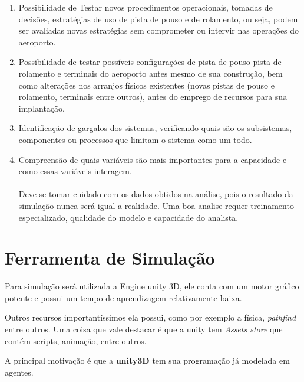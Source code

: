 \documentclass[12pt]{article}
\begin{document}
  
  \begin{enumerate}
  
  \item Possibilidade de Testar novos procedimentos operacionais, tomadas
   de decisões, estratégias de uso de pista de pouso e de rolamento, ou seja,
   podem ser avaliadas novas estratégias sem comprometer ou intervir nas 
   operações do aeroporto.
  
  \item Possibilidade de testar possíveis configurações de pista de pouso
    pista de rolamento e terminais do aeroporto antes mesmo de sua construção, 
    bem como alterações nos arranjos físicos existentes (novas pistas de pouso
    e rolamento, terminais entre outros), antes do emprego de recursos para
    sua implantação.
  
  \item Identificação de gargalos dos sistemas, verificando quais são os 
    subsistemas, componentes ou processos que limitam o sistema como um
    todo.
  
  \item Compreensão de quais variáveis são mais importantes para a capacidade
  e como essas variáveis interagem.
  
  \paragraph{}%
  Deve-se tomar cuidado com os dados obtidos na análise, pois o resultado 
  da simulação nunca será igual a realidade. Uma boa analise requer 
  treinamento especializado, qualidade do modelo e capacidade do analista.
  
  \end{enumerate}
  
  
  \section{Ferramenta de Simulação}
  
  Para simulação será utilizada a Engine unity 3D, ele conta com um motor 
  gráfico potente e possui um tempo de aprendizagem relativamente baixa.
  
  Outros recursos importantíssimos ela possui, como por exemplo a física, 
  \textit{pathfind} entre outros. Uma coisa que vale destacar é que a unity
  tem \textit{Assets store} que contém scripts, animação, entre outros.
  
  A principal motivação é que a \textbf{unity3D} tem sua programação já
  modelada em agentes.
  
\end{document}
